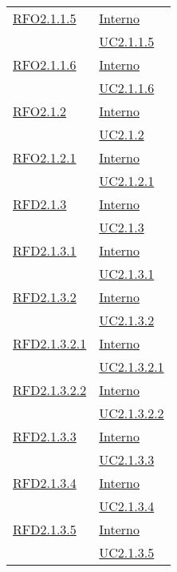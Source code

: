 \begin{longtable}{|>{\centering}m{5cm}|m{5cm}<{\centering}|}
\hyperlink{RFO2.1.1.5}{RFO2.1.1.5} & \hyperlink{Interno}{Interno}\\
& \hyperref[UC2.1.1.5]{UC2.1.1.5}\\ \hline

\hyperlink{RFO2.1.1.6}{RFO2.1.1.6} & \hyperlink{Interno}{Interno}\\
& \hyperref[UC2.1.1.6]{UC2.1.1.6}\\ \hline

\hyperlink{RFO2.1.2}{RFO2.1.2} & \hyperlink{Interno}{Interno}\\
& \hyperref[UC2.1.2]{UC2.1.2}\\ \hline

\hyperlink{RFO2.1.2.1}{RFO2.1.2.1} & \hyperlink{Interno}{Interno}\\
& \hyperref[UC2.1.2.1]{UC2.1.2.1}\\ \hline

\hyperlink{RFD2.1.3}{RFD2.1.3} & \hyperlink{Interno}{Interno}\\
& \hyperref[UC2.1.3]{UC2.1.3}\\ \hline

\hyperlink{RFD2.1.3.1}{RFD2.1.3.1} & \hyperlink{Interno}{Interno}\\
& \hyperref[UC2.1.3.1]{UC2.1.3.1}\\ \hline

\hyperlink{RFD2.1.3.2}{RFD2.1.3.2} & \hyperlink{Interno}{Interno}\\
& \hyperref[UC2.1.3.2]{UC2.1.3.2}\\ \hline

\hyperlink{RFD2.1.3.2.1}{RFD2.1.3.2.1} & \hyperlink{Interno}{Interno}\\
& \hyperref[UC2.1.3.2.1]{UC2.1.3.2.1}\\ \hline

\hyperlink{RFD2.1.3.2.2}{RFD2.1.3.2.2} & \hyperlink{Interno}{Interno}\\
& \hyperref[UC2.1.3.2.2]{UC2.1.3.2.2}\\ \hline

\hyperlink{RFD2.1.3.3}{RFD2.1.3.3} & \hyperlink{Interno}{Interno}\\
& \hyperref[UC2.1.3.3]{UC2.1.3.3}\\ \hline

\hyperlink{RFD2.1.3.4}{RFD2.1.3.4} & \hyperlink{Interno}{Interno}\\
& \hyperref[UC2.1.3.4]{UC2.1.3.4}\\ \hline

\hyperlink{RFD2.1.3.5}{RFD2.1.3.5} & \hyperlink{Interno}{Interno}\\
& \hyperref[UC2.1.3.5]{UC2.1.3.5}\\ \hline


\end{longtable}
